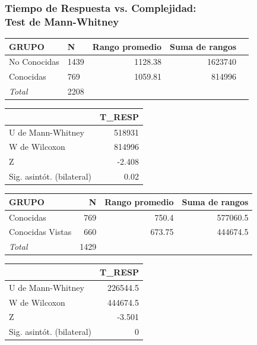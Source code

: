 \documentclass[10pt]{beamer}
\begin{document}
      \begin{frame}
      \tiny
	  \frametitle{Tiempo de Respuesta vs. Complejidad:\\Test de Mann-Whitney}
	\begin{table}
	  \begin{tabular}[t]{|l|l|r|r|r|}
	    \hline
		\textbf{GRUPO} & \textbf{N} & \textbf{Rango promedio} & \textbf{Suma de rangos} \\ \hline
		No Conocidas & 1439 & 1128.38 & 1623740 \\ \hline
		Conocidas & 769 & 1059.81 & 814996 \\ \hline
		\textit{Total} & 2208 &   &   \\ \hline
	  \end{tabular}   \begin{tabular}[t]{|l|r|}
	    \hline
		& \textbf{T\_RESP} \\ \hline
	      U de Mann-Whitney & 518931 \\ \hline
	      W de Wilcoxon & 814996 \\ \hline
	      Z & -2.408 \\ \hline
	      Sig. asintót. (bilateral) & 0.02 \\ \hline
	  \end{tabular}
	\end{table}

	\begin{table}
	  \begin{tabular}[t]{|l|r|r|r|}
	    \hline
		\textbf{GRUPO} & \textbf{N} & \textbf{Rango promedio} & \textbf{Suma de rangos} \\ \hline
		Conocidas & 769 & 750.4 & 577060.5 \\ \hline
		Conocidas Vistas & 660 & 673.75 & 444674.5 \\ \hline
		\textit{Total} & 1429 &   &   \\ \hline
	  \end{tabular}   \begin{tabular}[t]{|l|r|}
	    \hline
		& \textbf{T\_RESP} \\ \hline
	      U de Mann-Whitney & 226544.5 \\ \hline
	      W de Wilcoxon & 444674.5 \\ \hline
	      Z & -3.501 \\ \hline
	      Sig. asintót. (bilateral) & 0 \\ \hline
	  \end{tabular}
	\end{table}


\end{frame}
\end{document}
